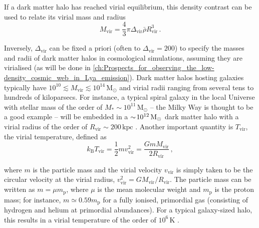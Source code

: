 If a dark matter halo has reached virial equilibrium, this density contrast can be used to relate its virial mass and radius
\begin{equation}
    \label{chIeq:Virial_mass}
    M_\text{vir} = \frac{4}{3} \pi \Delta_\text{vir} \bar{\rho} R_\text{vir}^3 \, .
\end{equation}

Inversely, $\Delta_\text{vir}$ can be fixed a priori (often to $\Delta_\text{vir} = 200$) to specify the masses and radii of dark matter halos in cosmological simulations, assuming they are virialised (as will be done in \cref{ch:Prospects_for_observing_the_low-density_cosmic_web_in_Lya_emission}). Dark matter halos hosting galaxies typically have $10^{10} \lesssim M_\text{vir} \lesssim 10^{14} \, \mathrm{M_\odot}$ and virial radii ranging from several tens to hundreds of kiloparsecs. For instance, a typical spiral galaxy in the local Universe with stellar mass of the order of $M_* \sim 10^{11} \, \mathrm{M_\odot}$ -- the Milky Way is thought to be a good example -- will be embedded in a $\sim \! 10^{12} \, \mathrm{M_\odot}$ dark matter halo with a virial radius of the order of $R_\text{vir} \sim 200 \, \mathrm{kpc}$ \citep[e.g.][]{2013ApJ...764L..31K}. Another important quantity is $T_\text{vir}$, the virial temperature, defined as
\begin{equation}
    \label{chIeq:Virial_temperature}
    k_\text{B} T_\text{vir} = \frac{1}{2} m v_\text{vir}^2 = \frac{G m M_\text{vir}}{2 R_\text{vir}} \, ,
\end{equation}

\noindent where $m$ is the particle mass and the virial velocity $v_\text{vir}$ is simply taken to be the circular velocity at the virial radius, $v_\text{vir}^2 = G M_\text{vir} / R_\text{vir}$. The particle mass can be written as $m = \mu m_\text{p}$, where $\mu$ is the mean molecular weight and $m_\text{p}$ is the proton mass; for instance, $m \simeq 0.59 m_\text{p}$ for a fully ionised, primordial gas (consisting of hydrogen and helium at primordial abundances). For a typical galaxy-sized halo, this results in a virial temperature of the order of $10^6 \, \mathrm{K}$ \citep[where, to good approximation, a primordial gas indeed is fully ionised; e.g.][]{2010gfe..book.....M}.

